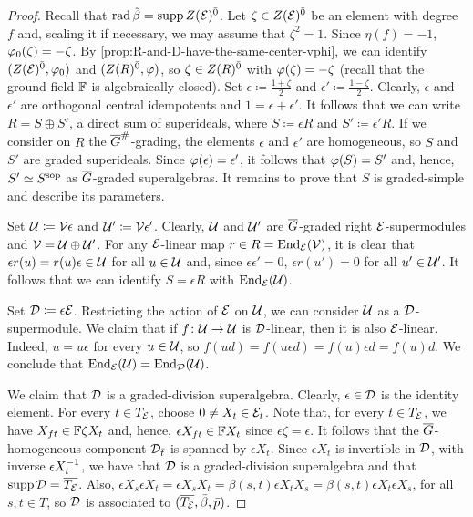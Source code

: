 \begin{proof}  
    Recall that $\operatorname{rad} \tilde\beta = \operatorname{supp} Z(\mathcal E)^{\bar0}$. 
    Let $\zeta \in Z(\mathcal E)^{\bar0}$ be an element with degree $f$ and, scaling it if necessary, we may assume that $\zeta^2 = 1$. 
    Since $\eta(f) = -1$, $\varphi_0(\zeta) = - \zeta$. 
    By \cref{prop:R-and-D-have-the-same-center-vphi}, we can identify $(Z(\mathcal E)^{\bar0}, \varphi_0)$ and $(Z(R)^{\bar0}, \varphi)$, so $\zeta \in Z(R)^{\bar0}$ with $\varphi(\zeta) = -\zeta$ (recall that the ground field $\mathbb{F}$ is algebraically closed). 
    Set $\epsilon \coloneqq \frac{1+\zeta}{2}$ and $\epsilon' \coloneqq \frac{1-\zeta}{2}$. 
    Clearly, $\epsilon$ and $\epsilon'$ are orthogonal central idempotents and $1 = \epsilon + \epsilon'$. 
    It follows that we can write $R = S \oplus S'$, a direct sum of superideals, where $S \coloneqq 
    \epsilon R$ and $S' \coloneqq \epsilon' R$. 
    If we consider on $R$ the $\barr G^\#$-grading, the elements $\epsilon$ and $\epsilon'$ are homogeneous, so $S$ and $S'$ are graded superideals. 
    Since $\varphi(\epsilon) = \epsilon'$, it follows that $\varphi(S) = S'$ and, hence, $S' \simeq S^{\mathrm{sop}}$ as $\barr G$-graded superalgebras. 
    It remains to prove that $S$ is graded-simple and describe its parameters. 
    
    Set $\mathcal U \coloneqq \mathcal V \epsilon$ and $\mathcal U' \coloneqq \mathcal V \epsilon'$. 
    Clearly, $\mathcal U$ and $\mathcal U'$ are $\barr G$-graded right $\mathcal E$-supermodules and $\mathcal V = \mathcal U \oplus \mathcal U'$. 
    For any $\mathcal E$-linear map $r \in R = \operatorname{End}_{\mathcal E} (\mathcal V)$, it is clear that $\epsilon r(u) = r(u)\epsilon \in \mathcal U$ for all $u\in \mathcal U$ and, since $\epsilon \epsilon' = 0$, $\epsilon r (u') = 0$ for all $u'\in \mathcal U'$. 
    It follows that we can identify $S = \epsilon R$ with $\operatorname{End}_{\mathcal E}(\mathcal U)$. 
    
    Set $\mathcal{D} \coloneqq \epsilon \mathcal E$. 
    Restricting the action of $\mathcal E$ on $\mathcal U$, we can consider $\mathcal U$ as a $\mathcal{D}$-supermodule. 
    We claim that if $f\colon \mathcal U \to \mathcal U$ is $\mathcal{D}$-linear, then it is also $\mathcal E$-linear. 
    Indeed, $u = u\epsilon$ for every $u \in \mathcal U$, so
    $f(ud) = f(u\epsilon d) = f(u) \epsilon d = f(u) d$. 
    We conclude that $\operatorname{End}_{\mathcal E} (\mathcal U) = \operatorname{End}_{\mathcal{D}}(\mathcal U)$. 
    
    We claim that $\mathcal{D}$ is a graded-division superalgebra. 
    Clearly, $\epsilon \in \mathcal{D}$ is the identity element. 
    For every $t \in T_{\mathcal E}$, choose $0\neq X_t \in \mathcal E_t$. 
    Note that, for every $t \in T_{\mathcal E}$, we have $X_{ft} \in \mathbb{F} \zeta X_t$ and, hence, $\epsilon X_{ft} \in \mathbb{F} X_t$ since $\epsilon\zeta = \epsilon$. 
    It follows that the $\barr G$-homogeneous component $\mathcal{D}_{\bar t}$ is spanned by $\epsilon X_t$. 
    Since $\epsilon X_t$ is invertible in $\mathcal{D}$, with inverse $\epsilon X_t^{-1}$, 
    we have that $\mathcal{D}$ is a graded-division superalgebra and that $\operatorname{supp} \mathcal{D} = \overline{T_{\mathcal E}}$. 
    Also, $\epsilon X_s \epsilon X_t = \epsilon X_s X_t = \beta(s,t) \epsilon X_t X_s = \beta(s,t) \epsilon X_t \epsilon X_s$, for all $s, t\in T$, so $\mathcal{D}$ is associated to $(\overline{T_{\mathcal E}}, \bar \beta, \bar p)$. 
    

\end{proof}
